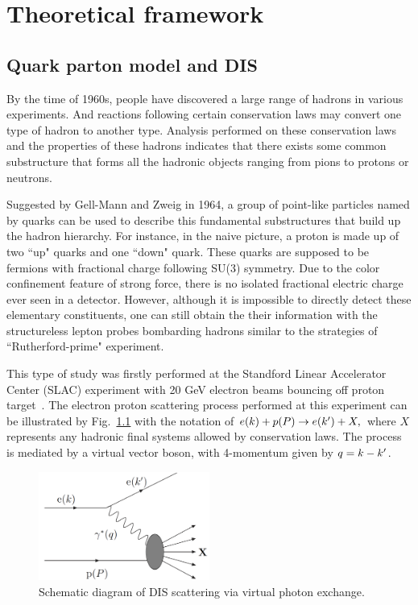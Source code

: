 \chapter{Theoretical framework}
\label{chp:theory}

\section{Quark parton model and DIS}
\label{sec:basicDIS}
By the time of 1960s, people have discovered a large range of hadrons 
in various experiments. And reactions following certain conservation laws
may convert one type of hadron to another type. Analysis performed on these 
conservation laws and the properties of these hadrons indicates that
there exists some common substructure that forms all the hadronic objects ranging
from pions to protons or neutrons.


Suggested by Gell-Mann and Zweig in 1964, a group of point-like particles named
by quarks can be used to describe this fundamental substructures that build up
the hadron hierarchy. For instance, in the naive picture, a proton is made up of
two ``up" quarks and one ``down" quark. These quarks are supposed to be fermions
with fractional charge following SU(3) symmetry. Due to the color confinement
feature of strong force, there is no isolated fractional electric charge ever
seen in a detector. However, although it is impossible to directly detect these
elementary constituents, one can still obtain the their information with the
structureless lepton probes bombarding hadrons similar to the strategies of
``Rutherford-prime" experiment.

This type of study was firstly performed at the Standford Linear Accelerator
Center (SLAC) experiment with 20 GeV electron beams bouncing off proton
target~\cite{Panofsky:1966gq}. The electron proton scattering process performed
at this experiment can be illustrated by Fig.~\ref{fig:DIS_kinematics} with the
notation of \( e(k)+p(P) \rightarrow e(k^{\prime}) + X, \) where $X$ represents any
hadronic final systems allowed by conservation laws. The process is mediated by
a virtual vector boson, with 4-momentum given by $q=k-k^{\prime}$.

\begin{figure}
\centering
\includegraphics[width=0.5\textwidth]{plots/chpt2/DIS_kinematics.png} 
\caption[DIS scattering diagram] {
Schematic diagram of DIS scattering via virtual photon exchange.}
\label{fig:DIS_kinematics}
\end{figure}

